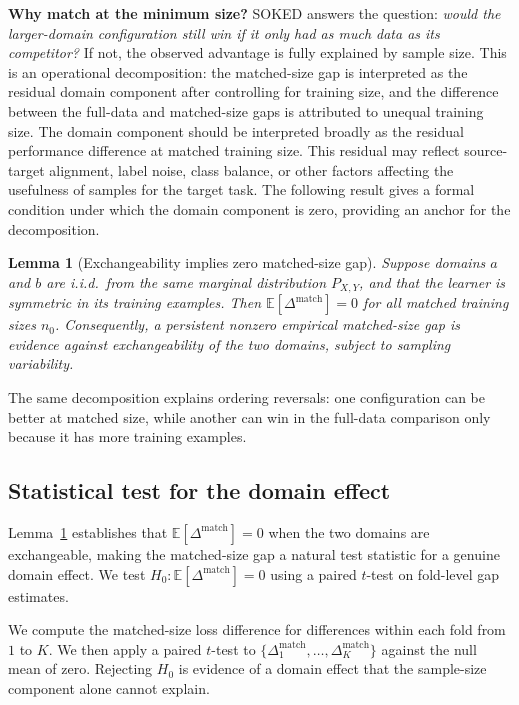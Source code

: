 \documentclass[twoside]{article}
\newtheorem{lemma}{Lemma}
\begin{document}
\textbf{Why match at the minimum size?}
SOKED answers the question: \emph{would the larger-domain configuration still win if it only had as much data as its competitor?}
If not, the observed advantage is fully explained by sample size.
This is an operational decomposition: the matched-size gap is interpreted as the residual domain component after controlling for training size, and the difference between the full-data and matched-size gaps is attributed to unequal training size.
The domain component should be interpreted broadly as the residual performance difference at matched training size.
This residual may reflect source-target alignment, label noise, class balance, or other factors affecting the usefulness of samples for the target task.
The following result gives a formal condition under which the domain component is zero, providing an anchor for the decomposition.

\begin{lemma}[Exchangeability implies zero matched-size gap]
\label{lem:exchangeability}
Suppose domains $a$ and $b$ are i.i.d.\ from the same marginal distribution $P_{X,Y}$, and that the learner is symmetric in its training examples.
Then $\mathbb{E}[\Delta^{\mathrm{match}}] = 0$ for all matched training sizes $n_0$.
Consequently, a persistent nonzero empirical matched-size gap is evidence against exchangeability of the two domains, subject to sampling variability.
\end{lemma}

The same decomposition explains ordering reversals: one configuration can be better at matched size, while another can win in the full-data comparison only because it has more training examples.


\subsection{Statistical test for the domain effect}
\label{sec:ttest}
Lemma~\ref{lem:exchangeability} establishes that $\mathbb{E}[\Delta^{\mathrm{match}}] = 0$ when the two domains are exchangeable, making the matched-size gap a natural test statistic for a genuine domain effect.
We test $H_0\colon \mathbb{E}[\Delta^{\mathrm{match}}] = 0$ using a paired $t$-test on fold-level gap estimates.

We compute the matched-size loss difference for differences within each fold from $1$ to $K$.
We then apply a paired $t$-test to $\{\Delta_1^{\mathrm{match}},\ldots,\Delta_K^{\mathrm{match}}\}$ against the null mean of zero.
Rejecting $H_0$ is evidence of a domain effect that the sample-size component alone cannot explain.
\end{document}
